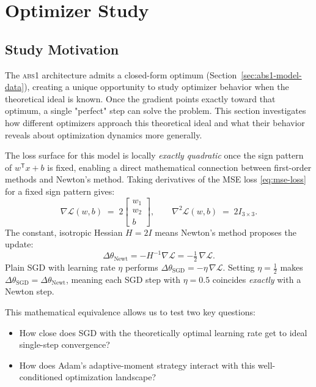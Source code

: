 ﻿%
\section{Optimizer Study}
\label{sec:abs1-optim}


\subsection*{Study Motivation}

The \textsc{abs1} architecture admits a closed-form optimum (Section~\ref{sec:abs1-model-data}), creating a unique opportunity to study optimizer behavior when the theoretical ideal is known. Once the gradient points exactly toward that optimum, a single "perfect" step can solve the problem. This section investigates how different optimizers approach this theoretical ideal and what their behavior reveals about optimization dynamics more generally.

The loss surface for this model is locally \emph{exactly quadratic} once the sign pattern of $w^{\mathsf T}x+b$ is fixed, enabling a direct mathematical connection between first-order methods and Newton's method. Taking derivatives of the MSE loss \eqref{eq:mse-loss} for a fixed sign pattern gives:
\[
   \nabla\! \mathcal L(w,b) \;=\; 2\begin{bmatrix}w_1\\ w_2\\ b\end{bmatrix},
   \qquad
   \nabla^2\! \mathcal L(w,b) \;=\; 2I_{3\times3}.
\]
The constant, isotropic Hessian $H = 2I$ means Newton's method proposes the update:
\[
   \Delta\theta_{\text{Newt}} = -H^{-1}\nabla\! \mathcal L = -\tfrac12\,\nabla\! \mathcal L.
\]
Plain SGD with learning rate $\eta$ performs $\Delta\theta_{\text{SGD}} = -\eta\,\nabla\! \mathcal L$. Setting $\eta=\tfrac12$ makes $\Delta\theta_{\text{SGD}} = \Delta\theta_{\text{Newt}}$, meaning each SGD step with $\eta=0.5$ coincides \emph{exactly} with a Newton step.

This mathematical equivalence allows us to test two key questions:
\begin{itemize}
   \item How close does SGD with the theoretically optimal learning rate get to ideal single-step convergence?
   \item How does Adam's adaptive-moment strategy interact with this well-conditioned optimization landscape?
\end{itemize}

